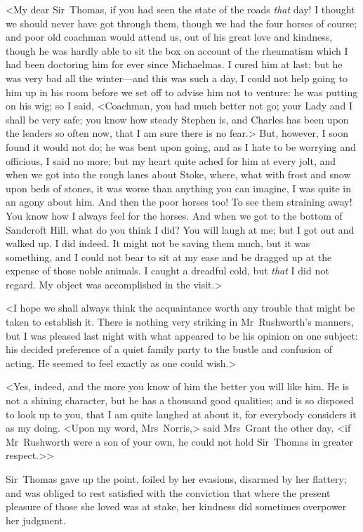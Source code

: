 <My dear Sir~Thomas, if you had seen the state of the roads \textit{that}  day! I thought we should never have got through them, though we had the four horses of course; and poor old coachman would attend us, out of his great love and kindness, though he was hardly able to sit the box on account of the rheumatism which I had been doctoring him for ever since Michaelmas. I cured him at last; but he was very bad all the winter—and this was such a day, I could not help going to him up in his room before we set off to advise him not to venture: he was putting on his wig; so I said, <Coachman, you had much better not go; your Lady and I shall be very safe; you know how steady Stephen is, and Charles has been upon the leaders so often now, that I am sure there is no fear.> But, however, I soon found it would not do; he was bent upon going, and as I hate to be worrying and officious, I said no more; but my heart quite ached for him at every jolt, and when we got into the rough lanes about Stoke, where, what with frost and snow upon beds of stones, it was worse than anything you can imagine, I was quite in an agony about him. And then the poor horses too! To see them straining away! You know how I always feel for the horses. And when we got to the bottom of Sandcroft Hill, what do you think I did? You will laugh at me; but I got out and walked up. I did indeed. It might not be saving them much, but it was something, and I could not bear to sit at my ease and be dragged up at the expense of those noble animals. I caught a dreadful cold, but \textit{that}  I did not regard. My object was accomplished in the visit.>

<I hope we shall always think the acquaintance worth any trouble that might be taken to establish it. There is nothing very striking in Mr~Rushworth's manners, but I was pleased last night with what appeared to be his opinion on one subject: his decided preference of a quiet family party to the bustle and confusion of acting. He seemed to feel exactly as one could wish.>

<Yes, indeed, and the more you know of him the better you will like him. He is not a shining character, but he has a thousand good qualities; and is so disposed to look up to you, that I am quite laughed at about it, for everybody considers it as my doing. <Upon my word, Mrs~Norris,> said Mrs~Grant the other day, <if Mr~Rushworth were a son of your own, he could not hold Sir~Thomas in greater respect.>>

Sir~Thomas gave up the point, foiled by her evasions, disarmed by her flattery; and was obliged to rest satisfied with the conviction that where the present pleasure of those she loved was at stake, her kindness did sometimes overpower her judgment.

